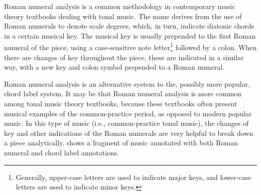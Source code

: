 

Roman numeral analysis is a common methodology in
contemporary music theory textbooks dealing with tonal
music. The name derives from the use of Roman numerals to
denote scale degrees, which, in turn, indicate diatonic
chords in a certain musical key. The musical key is usually
prepended to the first Roman numeral of the piece, using a
case-sensitive note letter\footnote{Generally, upper-case
letters are used to indicate major keys, and lower-case
letters are used to indicate minor keys.} followed by a
colon. When there are changes of key throughout the piece,
these are indicated in a similar way, with a new key and
colon symbol prepended to a Roman numeral.

Roman numeral analysis is an alternative system to the,
possibly more popular, chord label system. It may be that
Roman numeral analysis is more common among tonal music
theory textbooks, because these textbooks often present
musical examples of the common-practice period, as opposed
to modern popular music. In this type of music (i.e.,
common-practice tonal music), the changes of key and other
indications of the Roman numerals are very helpful to break
down a piece analytically.  shows a fragment
of music annotated with both Roman numeral and chord label
annotations.

